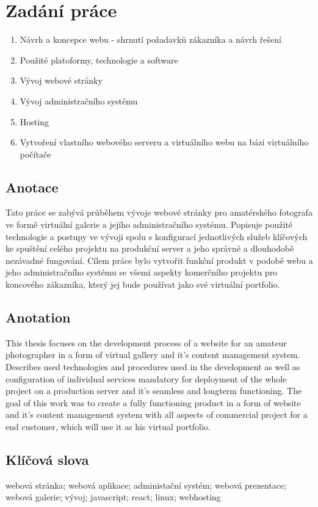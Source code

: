 \documentclass[12pt,a4paper]{report}
\begin{document}
  \chapter*{Zadání práce}
  \begin{enumerate}
    \item Návrh a koncepce webu - shrnutí požadavků zákazníka a návrh řešení
    \item Použité platoformy, technologie a software
    \item Vývoj webové stránky
    \item Vývoj administračního systému
    \item Hosting
    \item Vytvoření vlastního webového serveru a virtuálního webu na bázi virtuálního počítače
  \end{enumerate}
  \clearpage


  \section*{Anotace}
  Tato práce se zabývá průběhem vývoje webové stránky pro amatérského 
  fotografa ve formě virtuální galerie a jejího administračního systému.
  Popisuje použité technologie a postupy ve vývoji spolu s konfigurací
  jednotlivých služeb klíčových ke spuštění celého projektu
  na produkční server a jeho správné a dlouhodobě nezávadné fungování.
  Cílem práce bylo vytvořit funkční produkt v podobě webu a jeho administračního
  systému se všemi aspekty komerčního projektu pro koncového zákazníka, 
  který jej bude používat jako své virtuální portfolio.
  
  \section*{Anotation}
  This thesis focuses on the development process of a website for an amateur photographer
  in a form of virtual gallery and it's content management system. Describes used technologies
  and procedures used in the development as well as configuration of individual services mandatory for
  deployment of the whole project on a production server and it's seamless and longterm functioning.
  The goal of this work was to create a fully functioning product in a form of website and it's content management system 
  with all aspects of commercial project for a end customer, which will use it as his virtual portfolio.
  
  \section*{Klíčová slova}
  \noindent webová stránka; webová aplikace; administační systém; webová prezentace; webová galerie; vývoj; javascript; react; linux; webhosting
  
\end{document}
